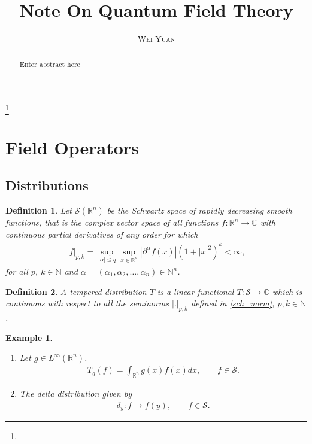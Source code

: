 \documentclass[a4paper,10pt]{amsart}
\newtheorem{example}{Example}[section]
\newtheorem{definition}{Definition}[section]
\newcommand{\SSS}{\mathcal S}
\newcommand{\C}{\mathbb C} %
\newcommand{\R}{\mathbb R}  %
\newcommand{\N}{\mathbb N} %
\newcommand{\titleinfo}{Note On Quantum Field Theory}
\newcommand{\authorinfo}{Wei Yuan}
\begin{document}
\title{\LARGE\textbf{\titleinfo}} 
\author{\large\textsc{\authorinfo}} 
\address{AMSS}  
\email{}

\date{}

\begin{abstract}
Enter abstract here
\end{abstract}

\thanks{}
\maketitle


\section{Field Operators}

\subsection{Distributions}

\begin{definition}
    Let $\SSS(\R^{n})$ be the Schwartz space of rapidly decreasing smooth
    functions, that is the complex vector space of all functions 
    $f: \R^n \to \C$ with continuous partial derivatives of any order for
    which
    \begin{align} \label{sch_norm}
        |f|_{p,k} = \sup_{|\alpha | \leq q} \sup_{x \in \R^n}
    | \partial^{\alpha} f(x)|(1+|x|^2)^k < \infty,
    \end{align}
    for all $p$, $k \in \N$ and $\alpha = (\alpha_1, \alpha_2, \ldots,
    \alpha_n) \in \N^{n}$.
\end{definition}

\begin{definition}
   A tempered distribution $T$ is a linear functional $T: \SSS \to \C$
   which is continuous with respect to all the seminorms $|.|_{p,k}$ 
   defined in \cref{sch_norm}, $p, k \in \N$.
\end{definition}

\begin{example}
   \begin{enumerate}
       \item Let $g \in L^{\infty}(\R^n)$. 
           \begin{align*}
               T_{g}(f) = \int_{\R^{n}} g(x)f(x) dx, \qquad f \in \SSS. 
           \end{align*}
        \item The delta distribution given by
            \begin{align*}
                \delta_{y}: f \to f(y), \qquad f \in \SSS.
            \end{align*}
   \end{enumerate} 
\end{example}
\end{document}
